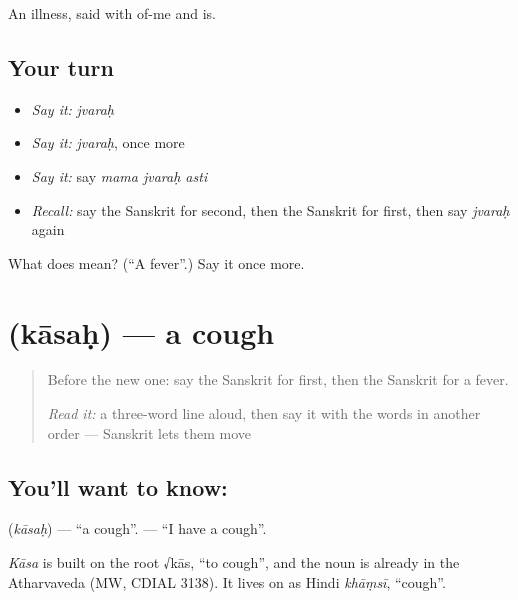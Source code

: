 \begin{grammarlens}[title={What you've built}]
An illness, said with of-me and is.
\end{grammarlens}

\subsection*{Your turn}
\begin{itemize}
\raggedright
  \item \emph{Say it:} \emph{jvaraḥ}
  \item \emph{Say it:} \emph{jvaraḥ}, once more
  \item \emph{Say it:} say \emph{mama jvaraḥ asti}
  \item \emph{Recall:} say the Sanskrit for second, then the Sanskrit for first, then say \emph{jvaraḥ} again
\end{itemize}

\begin{tcolorbox}[breakable,colback=teal!4,colframe=teal!35!black,title={Before you move on}]
What does  mean? (\textquotedblleft{}A fever\textquotedblright{}.) Say it once more.
\end{tcolorbox}
\section[\texorpdfstring{\sk{कासः} (kāsaḥ)}{कासः (kāsaḥ)}]{ (kāsaḥ) — a cough}

\label{lesson:SA-C66-cough}



\begin{quote}
Before the new one: say the Sanskrit for first, then the Sanskrit for a fever.

\emph{Read it:} a three-word line aloud, then say it with the words in another order — Sanskrit lets them move
\end{quote}

\subsection*{You'll want to know: }
\textbf{} (\emph{kāsaḥ}) — \textquotedblleft{}a cough\textquotedblright{}. \textbf{  } — \textquotedblleft{}I have a cough\textquotedblright{}.

\begin{cousinweb}
\emph{Kāsa} is built on the root √kās, \textquotedblleft{}to cough\textquotedblright{}, and the noun is already in the Atharvaveda (MW, CDIAL 3138). It lives on as Hindi \emph{khāṃsī}, \textquotedblleft{}cough\textquotedblright{}.
\end{cousinweb}

